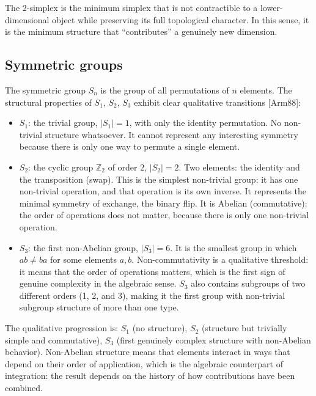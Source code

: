 \documentclass[12pt]{article}
\begin{document}
The 2-simplex is the minimum simplex that is not contractible to a
lower-dimensional object while preserving its full topological
character. In this sense, it is the minimum structure that
``contributes'' a genuinely new dimension.

\subsection{Symmetric groups}\label{symmetric-groups}

The symmetric group \(S_n\) is the group of all permutations of \(n\)
elements. The structural properties of \(S_1\), \(S_2\), \(S_3\) exhibit
clear qualitative transitions {[}Arm88{]}:

\begin{itemize}
\item
  \(S_1\): the trivial group, \(|S_1| = 1\), with only the identity
  permutation. No non-trivial structure whatsoever. It cannot represent
  any interesting symmetry because there is only one way to permute a
  single element.
\item
  \(S_2\): the cyclic group \(\mathbb{Z}_2\) of order 2, \(|S_2| = 2\).
  Two elements: the identity and the transposition (swap). This is the
  simplest non-trivial group: it has one non-trivial operation, and that
  operation is its own inverse. It represents the minimal symmetry of
  exchange, the binary flip. It is Abelian (commutative): the order of
  operations does not matter, because there is only one non-trivial
  operation.
\item
  \(S_3\): the first non-Abelian group, \(|S_3| = 6\). It is the
  smallest group in which \(ab \neq ba\) for some elements \(a, b\).
  Non-commutativity is a qualitative threshold: it means that the order
  of operations matters, which is the first sign of genuine complexity
  in the algebraic sense. \(S_3\) also contains subgroups of two
  different orders (1, 2, and 3), making it the first group with
  non-trivial subgroup structure of more than one type.
\end{itemize}

The qualitative progression is: \(S_1\) (no structure), \(S_2\)
(structure but trivially simple and commutative), \(S_3\) (first
genuinely complex structure with non-Abelian behavior). Non-Abelian
structure means that elements interact in ways that depend on their
order of application, which is the algebraic counterpart of integration:
the result depends on the history of how contributions have been
combined.
\end{document}
